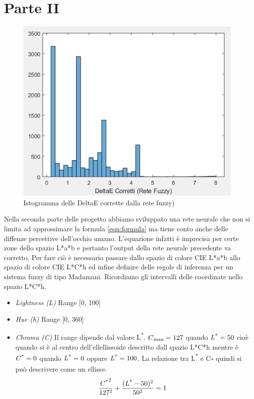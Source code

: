 \chapter{Parte II}

\begin{figure}
\begin{center}
	\includegraphics[scale=0.8]{images/rete2-istogramma-deltaecorretti.PNG}
\end{center}
\caption{Istogramma delle DeltaE corrette dalla rete fuzzy)}
\end{figure}

Nella seconda parte delle progetto abbiamo sviluppato una rete neurale che non si limita ad approssimare la formula \ref{eqn:formula} ma tiene conto anche delle diffenze percettive dell'occhio umano. L'equazione infatti è imprecisa per certe zone dello spazio L*a*b e pertanto l'output della rete neurale precedente va corretto. Per fare ciò è necessario passare dallo spazio di colore CIE L*a*b allo spazio di colore CIE L*C*h ed infine definire delle regole di inferenza per un sistema fuzzy di tipo Madamani.
Ricordiamo gli intervalli delle coordinate nello spazio L*C*h.
\begin{itemize}
	\item \textit{Lightness (L)} Range [0, 100]
	\item \textit{Hue (h)} Range  [0, 360\textdegree] 
    \item \textit{Chroma (C)} Il range dipende dal valore L\textsuperscript{*}. \(C\textsubscript{max}= 127\) quando \(L\textsuperscript{*}=50\) cioè quando si è al centro dell'ellellissoide descritto dall spazio L*C*h mentre è \(C\textsuperscript{*}=0\) quando \(L\textsuperscript{*}=0\) oppure \(L\textsuperscript{*}=100\). La relazione tra L\textsuperscript{*} e C\textsubscript{*} quindi si può descrivere come un ellisse.
    	\begin{equation}\label{eqn:ellipse}
       		\frac{C\textsuperscript{*}^2}{127^2} + \frac{(L\textsuperscript{*}-50)^2}{50^2} = 1
       	\end{equation}
\end{itemize}